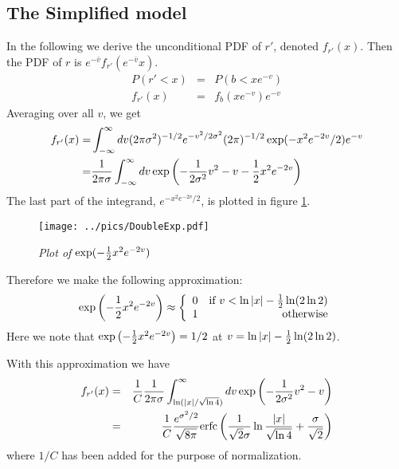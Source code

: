 \subsection{The Simplified model}\label{sec:SLV_Symmetric}
In the following we derive the unconditional PDF of $r'$, denoted
$f_{r'}(x)$. Then the PDF of $r$ is $e^{-\bar{v}}f_{r'}(e^{-\bar{v}}x)$.
\begin{eqnarray*}
  P(r' < x) &=& P(b < xe^{-v}) \\
  f_{r'}(x) &=& f_b(xe^{-v}) e^{-v}
\end{eqnarray*}
Averaging over all $v$, we get
\begin{equation}\label{eq:UncondPDFSymmetric}
  \begin{aligned}
    f_{r'}(x) =& \int_{-\infty}^{\infty} dv (2\pi\sigma^2)^{-1/2}
    e^{-v^2/2\sigma^2}(2\pi)^{-1/2} \exp(-x^2e^{-2v}/2) e^{-v} \\
    =& {1 \over 2\pi\sigma} \int_{-\infty}^{\infty} dv
    \exp\left(
      -{1 \over 2\sigma^2} v^2 - v -{1 \over 2} x^2 e^{-2v}
    \right)
  \end{aligned}
  \end{equation}
The last part of the integrand, $e^{-x^2 e^{-2v} / 2}$, is plotted in
figure \ref{fig:DoubleExp}.
\begin{figure}[htb!]
  \centering
  \texttt{[image: ../pics/DoubleExp.pdf]}
  \caption{\small \it Plot of $\exp(-{1 \over 2} x^2 e^{-2v})$}
  \label{fig:DoubleExp}
\end{figure}
Therefore we make the following approximation:
\[
\exp\left(-{1 \over 2} x^2 e^{-2v}\right) \approx \left\{
  \begin{array}{lr}
    0 & \text{if } v < \ln|x| -{1 \over 2} \ln(2\ln 2) \\
    1 & \text{otherwise}
  \end{array}
\right.
\]
Here we note that $\exp\left(-{1 \over 2} x^2 e^{-2v}\right) = 1/2$ at
$v = \ln|x| -{1 \over 2} \ln(2\ln 2)$.

With this approximation we have
\begin{eqnarray*}
  f_{r'}(x) &=& {1\over C}{1 \over 2\pi\sigma} \int_{\ln(|x|/\sqrt{\ln
      4})}^{\infty} dv
  \exp\left(-{1 \over 2\sigma^2} v^2 - v\right) \\
  &=& {1\over C}{e^{\sigma^2 / 2} \over \sqrt{8\pi}} \text{erfc} \left(
    {1 \over \sqrt{2}\sigma} \ln{|x| \over \sqrt{\ln 4}} + {\sigma
      \over \sqrt{2}}
  \right)
\end{eqnarray*}
where $1/C$ has been added for the purpose of normalization.

